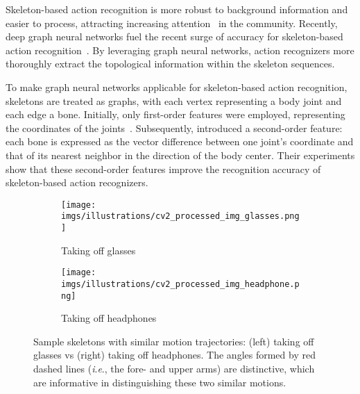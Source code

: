 \documentclass[journal,comsoc]{IEEEtran}
\newcommand{\ie}{\textit{i}.\textit{e}.,}
\begin{document}
Skeleton-based action recognition is more robust to background information and easier to process, attracting increasing attention~\cite{shi2019skeleton} in the community. Recently, deep graph neural networks fuel the recent surge of accuracy for skeleton-based action recognition~\cite{yan2018spatial}. By leveraging graph neural networks, action recognizers more thoroughly extract the topological information within the skeleton sequences. 

To make graph neural networks applicable for skeleton-based action recognition, skeletons are treated as graphs, with each vertex representing a body joint and each edge a bone. Initially, only first-order features were employed, representing the coordinates of the joints~\cite{yan2018spatial}. Subsequently, \cite{shi2019two} introduced a second-order feature: each bone is expressed as the vector difference between one joint's coordinate and that of its nearest neighbor in the direction of the body center. Their experiments show that these second-order features improve the recognition accuracy of skeleton-based action recognizers.

\begin{figure}[ht]
\centering
\begin{subfigure}{.21\textwidth}
  \centering
\texttt{[image: imgs/illustrations/cv2\_processed\_img\_glasses.png]}  
  \caption*{Taking off glasses }
  \label{fig:off_headphone}
\end{subfigure}
\begin{subfigure}{.21\textwidth}
  \centering
\texttt{[image: imgs/illustrations/cv2\_processed\_img\_headphone.png]}  
  \caption*{Taking off headphones }
  \label{fig:off_glass}
\end{subfigure}
\caption{Sample skeletons with similar motion trajectories: (left) taking off glasses vs (right) taking off headphones. 
The angles formed by red dashed lines (\ie{} the fore- and upper arms) are distinctive, which are informative in distinguishing these two similar motions.
}
\label{fig:skeleton_off_glass_headphone}
\end{figure}
\end{document}
